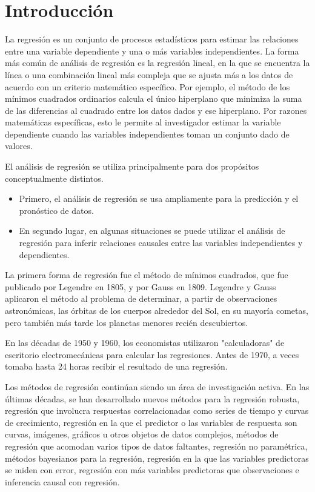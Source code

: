 \chapter*{Introducción}\label{chapter:introduction}

\qquad

La regresión es un conjunto de procesos estadísticos para estimar las relaciones entre una variable dependiente y una o más variables independientes. La forma más común de análisis de regresión es la regresión lineal, en la que se encuentra la línea o una combinación lineal más compleja que se ajusta más a los datos de acuerdo con un criterio matemático específico. Por ejemplo, el método de los mínimos cuadrados ordinarios calcula el único hiperplano que minimiza la suma de las diferencias al cuadrado entre los datos dados y ese hiperplano. Por razones matemáticas específicas, esto le permite al investigador estimar la variable dependiente cuando las variables independientes toman un conjunto dado de valores.

El análisis de regresión se utiliza principalmente para dos propósitos conceptualmente distintos.

\begin{itemize}
    \item Primero, el análisis de regresión se usa ampliamente para la predicción y el pronóstico de datos.
    \item En segundo lugar, en algunas situaciones se puede utilizar el análisis de regresión para inferir relaciones causales entre las variables independientes y dependientes.
\end{itemize}

La primera forma de regresión fue el método de mínimos cuadrados, que fue publicado por Legendre en 1805, y por Gauss en 1809. Legendre y Gauss aplicaron el método al problema de determinar, a partir de observaciones astronómicas, las órbitas de los cuerpos alrededor del Sol, en su mayoría cometas, pero también más tarde los planetas menores recién descubiertos.

En las décadas de 1950 y 1960, los economistas utilizaron "calculadoras" de escritorio electromecánicas para calcular las regresiones. Antes de 1970, a veces tomaba hasta 24 horas recibir el resultado de una regresión.

Los métodos de regresión continúan siendo un área de investigación activa. En las últimas décadas, se han desarrollado nuevos métodos para la regresión robusta, regresión que involucra respuestas correlacionadas como series de tiempo y curvas de crecimiento, regresión en la que el predictor o las variables de respuesta son curvas, imágenes, gráficos u otros objetos de datos complejos, métodos de regresión que acomodan varios tipos de datos faltantes, regresión no paramétrica, métodos bayesianos para la regresión, regresión en la que las variables predictoras se miden con error, regresión con más variables predictoras que observaciones e inferencia causal con regresión.

